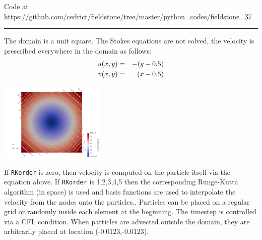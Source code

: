 

\begin{center}
Code at \url{https://github.com/cedrict/fieldstone/tree/master/python_codes/fieldstone_37}
\end{center}

\par\noindent\rule{\textwidth}{0.4pt}


The domain is a unit square. The Stokes equations are not solved, the velocity is prescribed 
everywhere in the domain as follows:
\begin{eqnarray}
u(x,y)&=&-(y-0.5)\nonumber\\
v(x,y)&=&(x-0.5) \nonumber
\end{eqnarray}

\begin{center}
\includegraphics[width=5cm]{python_codes/fieldstone_37/vel}
\end{center}

If {\tt RKorder} is zero, then velocity is computed on the particle itself via the equation above. 
If {\tt RKorder} is 1,2,3,4,5 then the corresponding Runge-Kutta algorithm (in space) is used and basis functions are
used to interpolate the velocity from the nodes onto the particles.. 
Particles can be placed on a regular grid or randomly inside each element at the beginning.
The timestep is controlled via a CFL condition.    
When particles are advected outside the domain, they are arbitrarily placed at location (-0.0123,-0.0123).


